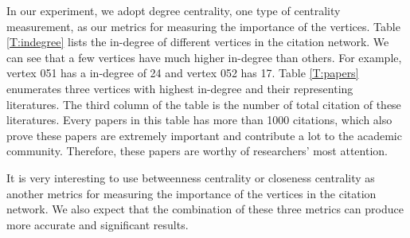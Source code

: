 %


In our experiment, we adopt degree centrality, one type of centrality measurement, as our metrics for measuring the importance of the vertices. Table \ref{T:indegree}  lists the in-degree of different vertices in the citation network. We can see that a few vertices have much higher in-degree than others. For example, vertex 051 has a in-degree of 24 and vertex 052 has 17. Table \ref{T:papers}  enumerates three vertices with highest in-degree and their representing literatures. The third column of the table is the number of total citation of these literatures. Every papers in this table has more than 1000 citations, which also prove these papers are extremely important and contribute a lot to the academic community.  Therefore, these papers are worthy of researchers' most attention.

It is very interesting to use betweenness centrality or closeness centrality as another metrics for measuring the importance of the vertices in the citation network. We also expect that the combination of these three metrics can produce more accurate and significant results.

